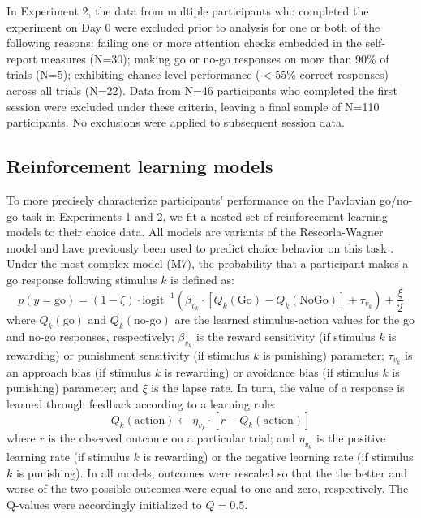 \documentclass[a4paper,12pt]{article}
\begin{document}
\begin{refsection}[supp]
In Experiment 2, the data from multiple participants who completed the experiment on Day 0 were excluded prior to analysis for one or both of the following reasons: failing one or more attention checks embedded in the self-report measures (N=30); making go or no-go responses on more than 90\% of trials (N=5); exhibiting chance-level performance ($<$55\% correct responses) across all trials (N=22). Data from N=46 participants who completed the first session were excluded under these criteria, leaving a final sample of N=110 participants. No exclusions were applied to subsequent session data. 

\subsection*{Reinforcement learning models}

To more precisely characterize participants' performance on the Pavlovian go/no-go task in Experiments 1 and 2, we fit a nested set of reinforcement learning models to their choice data.  All models are variants of the Rescorla-Wagner model and have previously been used to predict choice behavior on this task \cite{guitart2012go, mkrtchian2017modeling, moutoussis2018change, swart2017catecholaminergic}. Under the most complex model (M7), the probability that a participant makes a go response following stimulus $k$ is defined as:
\begin{equation}
    p(y = \text{go}) = (1 - \xi) \cdot \text{logit}^{-1} \left( \beta_{v_k} \cdot [Q_k(\text{Go}) - Q_k(\text{NoGo})] + \tau_{v_k} \right) + \frac{\xi}{2}
\end{equation}
where $Q_k(\text{go})$ and $Q_k(\text{no-go})$ are the learned stimulus-action values for the go and no-go responses, respectively; $\beta_{v_k}$ is the reward sensitivity (if stimulus $k$ is rewarding) or punishment sensitivity (if stimulus $k$ is punishing) parameter; $\tau_{v_k}$ is an approach bias (if stimulus $k$ is rewarding) or avoidance bias (if stimulus $k$ is punishing) parameter; and $\xi$ is the lapse rate. In turn, the value of a response is learned through feedback according to a learning rule:
\begin{equation}
    Q_k(\text{action}) \leftarrow \eta_{v_k} \cdot \left[ r - Q_k(\text{action}) \right]
\end{equation}
where $r$ is the observed outcome on a particular trial; and $\eta_{v_k}$ is the positive learning rate (if stimulus $k$ is rewarding) or the negative learning rate (if stimulus $k$ is punishing). In all models, outcomes were rescaled so that the the better and worse of the two possible outcomes were equal to one and zero, respectively. The Q-values were accordingly initialized to $Q = 0.5$. 


\end{refsection}
\end{document}
